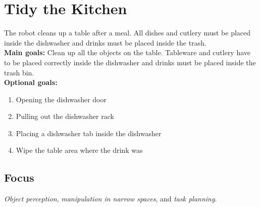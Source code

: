 \section{Tidy the Kitchen}
\label{test:tidy-the-kitchen}
The robot cleans up a table after a meal. All dishes and cutlery must be placed inside the dishwasher and drinks must be placed inside the trash. \\

\noindent \textbf{Main goals:}  Clean up all the objects on the table. Tableware and cutlery have to be placed correctly inside the dishwasher and drinks must be placed inside the trash bin. \\

\noindent \textbf{Optional goals:}
\begin{enumerate}[nosep]
	\item Opening the dishwasher door
	\item Pulling out the dishwasher rack
	\item Placing a dishwasher tab inside the dishwasher
	\item Wipe the table area where the drink was
\end{enumerate}

\subsection*{Focus}
\emph{Object perception}, \emph{manipulation in narrow spaces}, and \emph{task planning}.

